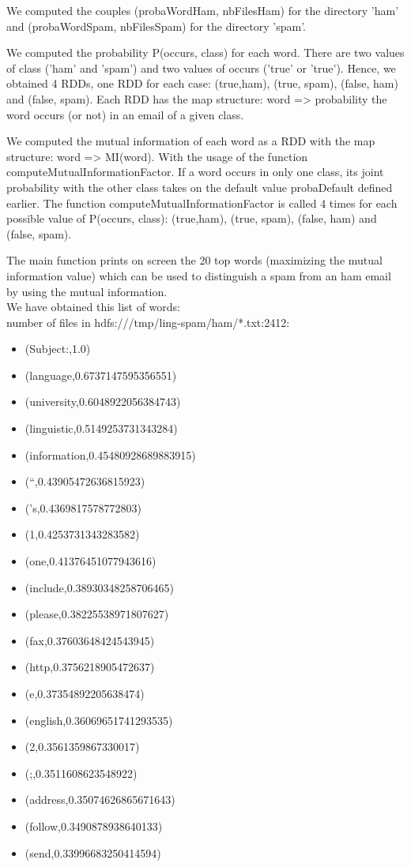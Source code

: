 \documentclass[paper=a4, fontsize=11pt]{scrartcl}
\numberwithin{equation}{section}		%
\numberwithin{figure}{section}			%
\numberwithin{table}{section}				%
\begin{document}
\begin{alphalist}
	\item We computed the couples (probaWordHam, nbFilesHam) for the directory 'ham' and (probaWordSpam, nbFilesSpam) for the directory 'spam'.
	\item We computed the probability P(occurs, class) for each word. There are two values of class ('ham' and 'spam') and two values of occurs ('true' or 'true'). Hence, we obtained 4 RDDs, one RDD for each case: (true,ham), (true, spam), (false, ham) and (false, spam). Each RDD has the map structure: word => probability the word occurs (or not) in an email of a given class.
	\item We computed the mutual information of each word as a RDD with the map structure: word => MI(word). With the usage of the function	computeMutualInformationFactor. If a word occurs in only one class, its	joint probability with the other class takes on the default value probaDefault defined earlier.	The function computeMutualInformationFactor is called 4 times for each possible value of P(occurs, class): (true,ham), (true, spam), (false, ham) and (false, spam).
	\item The main function  prints on screen the 20 top words (maximizing the mutual information value) which can be used to distinguish a spam from an ham email by using the mutual information. \\

We have obtained this list of words: \\
number of files in hdfs:///tmp/ling-spam/ham/*.txt:2412:

      \begin{itemize}
	      \item (Subject:,1.0)
	      \item (language,0.6737147595356551)
	      \item (university,0.6048922056384743)
	      \item (linguistic,0.5149253731343284)
	      \item (information,0.45480928689883915)
	      \item (``,0.43905472636815923)
	      \item ('s,0.4369817578772803)
	      \item (1,0.4253731343283582)
	      \item (one,0.41376451077943616)
	      \item (include,0.38930348258706465)
	      \item (please,0.38225538971807627)
	      \item (fax,0.37603648424543945)
	      \item (http,0.3756218905472637)
	      \item (e,0.37354892205638474)
	      \item (english,0.36069651741293535)
	      \item (2,0.3561359867330017)
	      \item (;,0.3511608623548922)
	      \item (address,0.35074626865671643)
	      \item (follow,0.3490878938640133)
	      \item (send,0.33996683250414594)


\end{itemize}
\end{alphalist}
\end{document}
